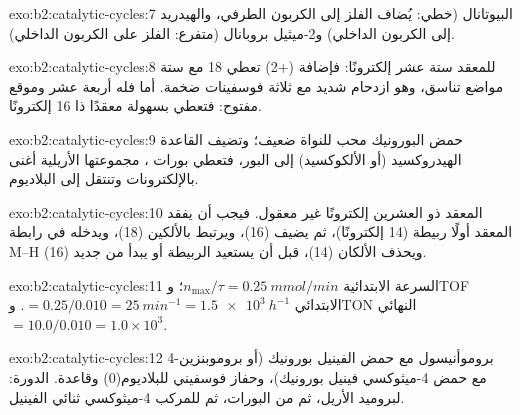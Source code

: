 \begin{solution}{exo:b2:catalytic-cycles:7}
البيوتانال  (خطي: يُضاف الفلز إلى الكربون الطرفي، والهيدريد إلى
الكربون الداخلي) و2-ميثيل بروبانال  (متفرع: الفلز على الكربون
الداخلي).
\end{solution}

\begin{solution}{exo:b2:catalytic-cycles:8}
للمعقد  ستة عشر إلكترونًا: فإضافة  (+2) تعطي 18 مع ستة
مواضع تناسق، وهو ازدحام شديد مع ثلاثة فوسفينات ضخمة. أما  فله أربعة عشر
وموقع مفتوح: فتعطي  بسهولة معقدًا ذا 16 إلكترونًا.
\end{solution}

\begin{solution}{exo:b2:catalytic-cycles:9}
حمض البورونيك محب للنواة ضعيف؛ وتضيف القاعدة الهيدروكسيد (أو الألكوكسيد) إلى البور،
فتعطي بورات ، مجموعتها الأريلية أغنى بالإلكترونات وتنتقل إلى
البلاديوم.
\end{solution}

\begin{solution}{exo:b2:catalytic-cycles:10}
المعقد ذو العشرين إلكترونًا غير معقول. فيجب أن يفقد المعقد أولًا ربيطة (14 إلكترونًا)، ثم
يضيف  (16)، ويرتبط بالألكين (18)، ويدخله في رابطة M--H (16) ويحذف
الألكان (14)، قبل أن يستعيد الربيطة أو يبدأ من جديد.
\end{solution}

\begin{solution}{exo:b2:catalytic-cycles:11}
السرعة الابتدائية $n_{\max}/\tau = \qty{0.25}{mmol/min}$؛ وTOF الابتدائي $= 0.25/0.010 =
\qty{25}{min^{-1}} = \qty{1.5e3}{h^{-1}}$. وTON النهائي $= 10.0/0.010 = 1.0 \times 10^3$.
\end{solution}

\begin{solution}{exo:b2:catalytic-cycles:12}
4-بروموأنيسول مع حمض الفينيل بورونيك (أو بروموبنزين مع حمض 4-ميثوكسي فينيل بورونيك)،
وحفاز فوسفيني للبلاديوم(0) وقاعدة. الدورة: 
لبروميد الأريل، ثم  من البورات، ثم  للمركب
4-ميثوكسي ثنائي الفينيل.
\end{solution}

